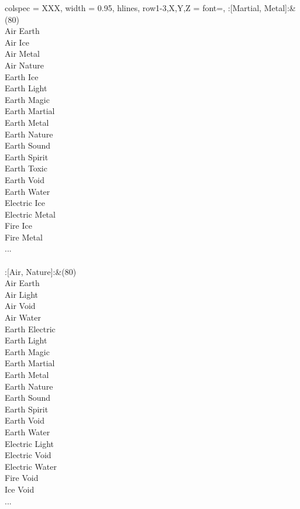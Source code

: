 \begin{longtblr}[
	caption = {2v2 Defending Weak},
	label = {2v2-Defending-Weak},
]{
	colspec = {XXX}, width = 0.95\linewidth,
	hlines,
	row{1-3,X,Y,Z} = {font=\bfseries},
}
	:[Martial, Metal]:&{(80)\\
	Air Earth \\
	Air Ice \\
	Air Metal \\
	Air Nature \\
	Earth Ice \\
	Earth Light \\
	Earth Magic \\
	Earth Martial \\
	Earth Metal \\
	Earth Nature \\
	Earth Sound \\
	Earth Spirit \\
	Earth Toxic \\
	Earth Void \\
	Earth Water \\
	Electric Ice \\
	Electric Metal \\
	Fire Ice \\
	Fire Metal \\
	...\\
	}\\

	:[Air, Nature]:&{(80)\\
	Air Earth \\
	Air Light \\
	Air Void \\
	Air Water \\
	Earth Electric \\
	Earth Light \\
	Earth Magic \\
	Earth Martial \\
	Earth Metal \\
	Earth Nature \\
	Earth Sound \\
	Earth Spirit \\
	Earth Void \\
	Earth Water \\
	Electric Light \\
	Electric Void \\
	Electric Water \\
	Fire Void \\
	Ice Void \\
	...\\
	}\\


\end{longtblr}
